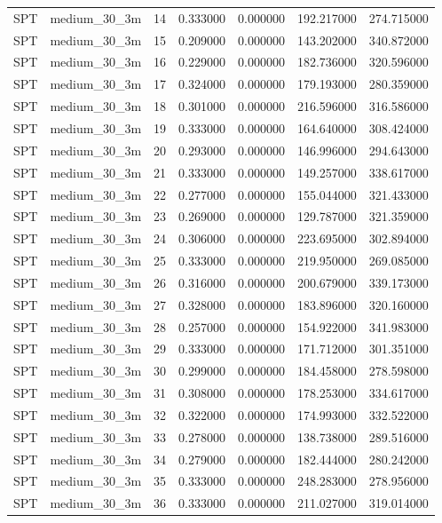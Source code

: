 \begin{tabular}{llrrrrr}
SPT & medium_30_3m & 14 & 0.333000 & 0.000000 & 192.217000 & 274.715000 \\
SPT & medium_30_3m & 15 & 0.209000 & 0.000000 & 143.202000 & 340.872000 \\
SPT & medium_30_3m & 16 & 0.229000 & 0.000000 & 182.736000 & 320.596000 \\
SPT & medium_30_3m & 17 & 0.324000 & 0.000000 & 179.193000 & 280.359000 \\
SPT & medium_30_3m & 18 & 0.301000 & 0.000000 & 216.596000 & 316.586000 \\
SPT & medium_30_3m & 19 & 0.333000 & 0.000000 & 164.640000 & 308.424000 \\
SPT & medium_30_3m & 20 & 0.293000 & 0.000000 & 146.996000 & 294.643000 \\
SPT & medium_30_3m & 21 & 0.333000 & 0.000000 & 149.257000 & 338.617000 \\
SPT & medium_30_3m & 22 & 0.277000 & 0.000000 & 155.044000 & 321.433000 \\
SPT & medium_30_3m & 23 & 0.269000 & 0.000000 & 129.787000 & 321.359000 \\
SPT & medium_30_3m & 24 & 0.306000 & 0.000000 & 223.695000 & 302.894000 \\
SPT & medium_30_3m & 25 & 0.333000 & 0.000000 & 219.950000 & 269.085000 \\
SPT & medium_30_3m & 26 & 0.316000 & 0.000000 & 200.679000 & 339.173000 \\
SPT & medium_30_3m & 27 & 0.328000 & 0.000000 & 183.896000 & 320.160000 \\
SPT & medium_30_3m & 28 & 0.257000 & 0.000000 & 154.922000 & 341.983000 \\
SPT & medium_30_3m & 29 & 0.333000 & 0.000000 & 171.712000 & 301.351000 \\
SPT & medium_30_3m & 30 & 0.299000 & 0.000000 & 184.458000 & 278.598000 \\
SPT & medium_30_3m & 31 & 0.308000 & 0.000000 & 178.253000 & 334.617000 \\
SPT & medium_30_3m & 32 & 0.322000 & 0.000000 & 174.993000 & 332.522000 \\
SPT & medium_30_3m & 33 & 0.278000 & 0.000000 & 138.738000 & 289.516000 \\
SPT & medium_30_3m & 34 & 0.279000 & 0.000000 & 182.444000 & 280.242000 \\
SPT & medium_30_3m & 35 & 0.333000 & 0.000000 & 248.283000 & 278.956000 \\
SPT & medium_30_3m & 36 & 0.333000 & 0.000000 & 211.027000 & 319.014000 \\

\end{tabular}

